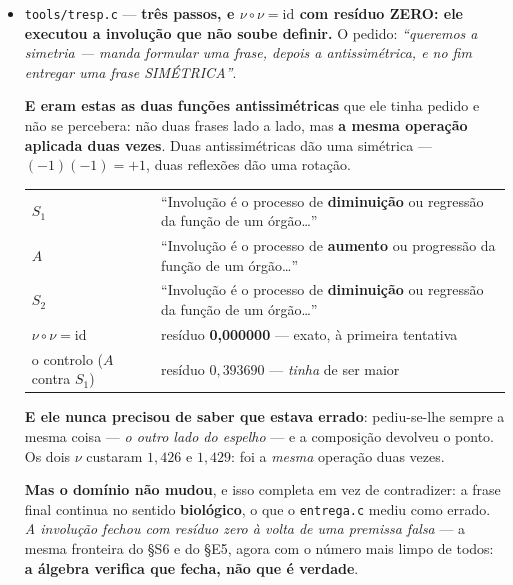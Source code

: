 \documentclass[11pt]{article}
\newcommand{\code}[1]{\texttt{\small #1}}
\theoremstyle{plain}
\theoremstyle{remark}
\begin{document}
\begin{itemize}
\textbf{E a explicação é do CORPO, não do modelo:} $\nu\circ\nu = \mathrm{id}$ exige que $\nu$ seja
\textbf{único}. No corpo há exatamente um automorfismo não-trivial (é Galois em grau~2, §F2), logo
aplicar duas vezes só \emph{pode} voltar. Na linguagem há \textbf{infinitas} frases que são ``o
ambiente'' de uma dada. \emph{Não é ele que falha a involução --- é o espaço que não a tem.} E é por
isso que o \code{tresp.c} fechou com zero exato: lá o dual era \textbf{lexical}, e trocar uma
palavra desfaz-se trocando de volta. \textbf{13 unidades, resíduo 0.}

\item \code{tools/tresp.c} --- \textbf{três passos, e $\nu\circ\nu = \mathrm{id}$ com resíduo
ZERO: ele executou a involução que não soube definir.} O pedido: \emph{``queremos a simetria --- manda
formular uma frase, depois a antissimétrica, e no fim entregar uma frase SIMÉTRICA''}.

\textbf{E eram estas as duas funções antissimétricas} que ele tinha pedido e não se percebera: não
duas frases lado a lado, mas \textbf{a mesma operação aplicada duas vezes}. Duas antissimétricas dão
uma simétrica --- $(-1)(-1)=+1$, duas reflexões dão uma rotação.

\begin{center}
\begin{tabular}{ll}
\toprule
$S_1$ & ``Involução é o processo de \textbf{diminuição} ou regressão da função de um órgão…'' \\
$A$ & ``Involução é o processo de \textbf{aumento} ou progressão da função de um órgão…'' \\
$S_2$ & ``Involução é o processo de \textbf{diminuição} ou regressão da função de um órgão…'' \\
\midrule
$\nu\circ\nu = \mathrm{id}$ & resíduo \textbf{0,000000} --- exato, à primeira tentativa \\
o controlo ($A$ contra $S_1$) & resíduo $0{,}393690$ --- \emph{tinha} de ser maior \\
\bottomrule
\end{tabular}
\end{center}

\noindent \textbf{E ele nunca precisou de saber que estava errado}: pediu-se-lhe sempre a mesma
coisa --- \emph{o outro lado do espelho} --- e a composição devolveu o ponto. Os dois $\nu$ custaram
$1{,}426$ e $1{,}429$: foi a \emph{mesma} operação duas vezes.

\textbf{Mas o domínio não mudou}, e isso completa em vez de contradizer: a frase final continua no
sentido \textbf{biológico}, o que o \code{entrega.c} mediu como errado. \emph{A involução fechou com
resíduo zero à volta de uma premissa falsa} --- a mesma fronteira do §S6 e do §E5, agora com o
número mais limpo de todos: \textbf{a álgebra verifica que fecha, não que é verdade}.


\end{itemize}
\end{document}
